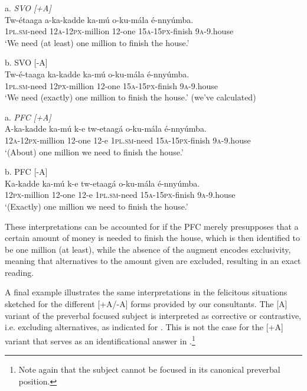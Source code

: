 \documentclass[output=paper]{langsci/langscibook}
\begin{document}
\ea
{a.  \textit{SVO [+A]}}\\
\gll   Tw-étaaga  a-ka-kadde    ka-mú  o-ku-mála    é-nnyúmba.\\
       \textsc{1pl}.\textsc{sm}-need  \textsc{12a}-\textsc{12px}-million  12-one  \textsc{15a}-\textsc{15px}-finish  \textsc{9a}-9.house\\
\glt   ‘We need (at least) one million to finish the house.’
\z

\ea
{b.  SVO [-A]}\\
\gll Tw-é-taaga  ka-kadde  ka-mú  o-ku-mála    é-nnyúmba.\\
     \textsc{1pl}.\textsc{sm}-need  \textsc{12px}-million  12-one  \textsc{15a}-\textsc{15px}-finish  \textsc{9a}-9.house\\
\glt ‘We need (exactly) one million to finish the house.’ (we’ve calculated)
\z

\ea
{a.  \textit{PFC [+A]}}\\
\gll A-ka-kadde  ka-mú  k-e  tw-etaagá  o-ku-mála    é-nnyúmba.\\
     \textsc{12a}-\textsc{12px}-million  12-one  12-e  \textsc{1pl}.\textsc{sm}-need  \textsc{15a}-\textsc{15px}-finish  \textsc{9a}-9.house\\
\glt ‘(About) one million we need to finish the house.’
\z

\ea
{b.  PFC [-A]}\\
\gll Ka-kadde    ka-mú  k-e  tw-etaagá  o-ku-mála    é-nnyúmba.\\
     \textsc{12px}-million  12-one  12-e  \textsc{1pl}.\textsc{sm}-need  \textsc{15a}-\textsc{15px}-finish  \textsc{9a}-9.house\\
\glt ‘(Exactly) one million we need to finish the house.’
\z

These interpretations can be accounted for if the PFC merely presupposes that a certain amount of money is needed to finish the house, which is then identified to be one million (at least), while the absence of the augment encodes exclusivity, meaning that alternatives to the amount given are excluded, resulting in an exact reading.

A final example illustrates the same interpretations in the felicitous situations sketched for the different [+A/-A] forms provided by our consultants. The [A] variant of the preverbal focused subject is interpreted as corrective or contrastive, i.e. excluding alternatives, as indicated for . This is not the case for the [+A] variant that serves as an identificational answer in .\footnote{Note again that the subject cannot be focused in its canonical preverbal position.}
\end{document}
